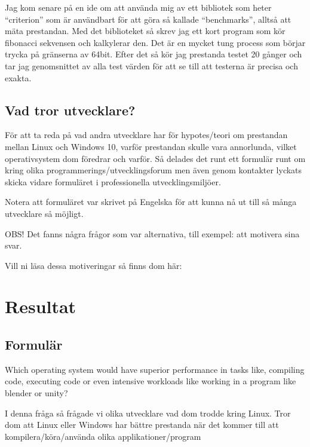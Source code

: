 \documentclass[12pt, a4paper]{report}
\begin{document}
Jag kom senare på en ide om att använda mig av ett bibliotek som heter ``criterion'' som är användbart för att göra så kallade ``benchmarks'', alltså att mäta prestandan. Med det biblioteket så skrev jag ett kort program som kör fibonacci sekvensen och kalkylerar den. Det är en mycket tung process som börjar trycka på gränserna av 64bit. Efter det så kör jag prestanda testet 20 gånger och tar jag genomsnittet av alla test värden för att se till att testerna är precisa och exakta.
 
 
\subsection{Vad tror utvecklare?}
 
   För att ta reda på vad andra utvecklare har för hypotes/teori om prestandan mellan Linux och Windows 10, varför prestandan skulle vara annorlunda, vilket operativsystem dom föredrar och varför. Så delades det runt ett formulär runt om kring olika programmerings/utvecklingsforum men även genom kontakter lyckats skicka vidare formuläret i professionella utvecklingsmiljöer.
 
   Notera att formuläret var skrivet på Engelska för att kunna nå ut till så många utvecklare så möjligt.
    
   \vspace{1cm}
 
 
   \small{OBS! Det fanns några frågor som var alternativa, till exempel: att motivera sina svar.
  
   Vill ni läsa dessa motiveringar så finns dom här:} 
 

\section{Resultat}

\subsection{Formulär}

\large {Which operating system would have superior performance in tasks like, compiling code, executing code or even intensive workloads like working in a program  like blender or unity?}
 
   \vspace{.5cm}
 
   \normalsize I denna fråga så frågade vi olika utvecklare vad dom trodde kring Linux. Tror dom att Linux eller Windows har bättre prestanda när det kommer till att kompilera/köra/använda olika applikationer/program
 
\end{document}
